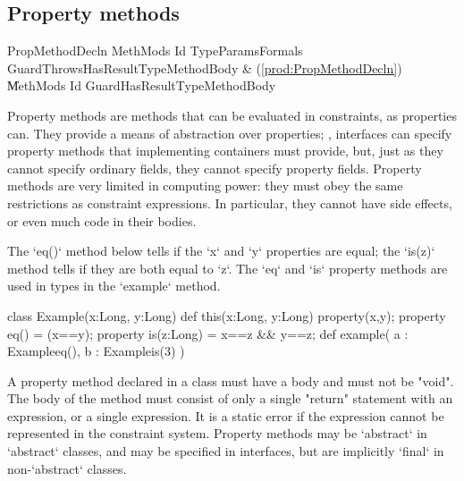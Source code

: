 

\subsection{Property methods}

\begin{bbgrammar}
     PropMethodDecln \: MethMods Id TypeParams\opt Formals Guard\opt Throws\opt HasResultType\opt MethodBody & (\ref{prod:PropMethodDecln}) \\
                     \| MethMods Id Guard\opt HasResultType\opt MethodBody \\
\end{bbgrammar}

Property methods are methods that can be evaluated in constraints, as
properties can.   They provide a means of abstraction over properties; \eg,
interfaces can specify property methods that implementing containers must
provide, but, just as they cannot specify ordinary fields, they cannot specify
property fields.   Property methods are very limited in computing power: they
must obey the same restrictions as constraint expressions.  In particular,
they cannot have side effects, or even much code in their bodies.


\begin{ex}
The \xcd`eq()` method below tells if the \xcd`x` and \xcd`y`
properties are equal; the \xcd`is(z)` method tells if they are both equal to
\xcd`z`.  
The \xcd`eq` and \xcd`is` property methods are used in types in the
\xcd`example` method.
\begin{xten}
class Example(x:Long, y:Long) {
   def this(x:Long, y:Long) { property(x,y); }
   property eq() = (x==y);
   property is(z:Long) = x==z && y==z;
   def example( a : Example{eq()}, b : Example{is(3)} ) {}
}
\end{xten}
%
\end{ex}

A property method declared in a class must have
a body and must not be \xcd"void".  The body of the method must
consist of only a single \xcd"return" statement with an expression,  or a single
expression.  It is a static error if the expression cannot be
represented in the constraint system.   Property methods may be \xcd`abstract`
in \xcd`abstract` classes, and may be specified in interfaces, but are
implicitly \xcd`final` in 
non-\xcd`abstract` classes. 

